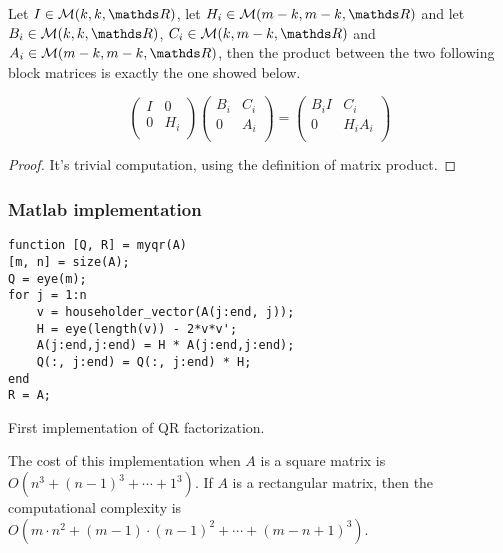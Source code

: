 \documentclass[computational_mathematics.tex]{subfiles}
\begin{document}
\begin{theorem}
  Let $I \in \mathcal{M}(k, k, \R)$, let $H_{i} \in \mathcal{M}(m-k, m-k, \R)$ and let $B_{i} \in \mathcal{M}(k, k, \R)$, $C_{i} \in \mathcal{M}(k, m-k, \R)$ and $A_{i} \in \mathcal{M}(m-k, m-k, \R)$, then the product between the two following block matrices is exactly the one showed below.

\[\begin{pmatrix}
    I & 0\\
    0 & H_{i}\\
  \end{pmatrix} 
  \begin{pmatrix}
    B_{i} & C_{i}\\
    0 & A_{i}\\
  \end{pmatrix}
  = 
  \begin{pmatrix}
    B_{i}I & C_{i}\\
    0 & H_{i} A_{i}\\
  \end{pmatrix}
\]
\end{theorem}

\begin{proof}
  It's trivial computation, using the definition of matrix product.
\end{proof}

\subsubsection{Matlab implementation}

\begin{center}
\begin{minipage}{.9\linewidth}
\begin{algorithm}[H]
\begin{verbatim}
function [Q, R] = myqr(A)
[m, n] = size(A);
Q = eye(m);
for j = 1:n
    v = householder_vector(A(j:end, j));
    H = eye(length(v)) - 2*v*v';
    A(j:end,j:end) = H * A(j:end,j:end);
    Q(:, j:end) = Q(:, j:end) * H;
end
R = A;
\end{verbatim}
  \label{alg:26ottQR1}
\caption{First implementation of QR factorization.}
\end{algorithm}
\end{minipage}
\end{center}

\begin{proposition}
  The cost of this implementation when $A$ is a square matrix is $O(n^{3} + {(n-1)}^{3} + \cdots + 1^{3})$. If $A$ is a rectangular matrix, then the computational complexity is $O(m \cdot n^{2} + {(m-1) \cdot (n-1)}^{2} + \cdots + {(m - n + 1)}^{3})$.
\end{proposition}
\end{document}
